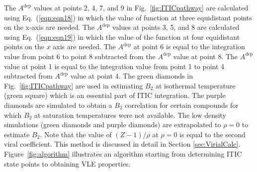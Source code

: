\documentclass[5p,times]{elsarticle}
\begin{document}
The $A^{\mathrm{dep}}$ values at points 2, 4, 7, and 9 in Fig.~\ref{fig:ITICpathway} are calculated using Eq.~(\ref{eqn:eqn18}) in which the value of function at three equidistant points on the x-axis are needed. The $A^{\mathrm{dep}}$ values at points 3, 5, and 8 are calculated using Eq.~(\ref{eqn:eqn19}) in which the value of the function at four equidistant points on the $x$ axis are needed. The $A^{\mathrm{dep}}$ at point 6 is equal to the integration value from point 6 to point 8 subtracted from the $A^{\mathrm{dep}}$ value at point 8. The $A^{\mathrm{dep}}$ value at point 1 is equal to the integration value from point 1 to point 4 subtracted from $A^{\mathrm{dep}}$ value at point 4. The green diamonds in Fig.~\ref{fig:ITICpathway} are used in estimating $B_2$ at isothermal temperature (green square) which is an essential part of ITIC integration. The purple diamonds are simulated to obtain a $B_2$ correlation for certain compounds for which $B_2$ at saturation temperatures were not available. The low density simulations (green diamonds and purple diamonds) are extrapolated to $\rho=0$ to estimate $B_2$. Note that the value of $(Z-1)/\rho$ at $\rho=0$ is equal to the second viral coefficient. This method is discussed in detail in Section \ref{sec:VirialCalc}. Figure~\ref{fig:algorithm} illustrates an algorithm starting from determining  ITIC state points to obtaining VLE properties.
\end{document}
